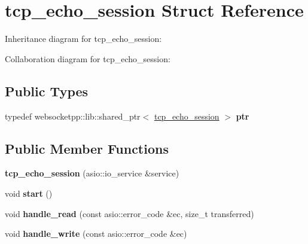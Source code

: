 \hypertarget{structtcp__echo__session}{}\section{tcp\+\_\+echo\+\_\+session Struct Reference}
\label{structtcp__echo__session}


Inheritance diagram for tcp\+\_\+echo\+\_\+session\+:


Collaboration diagram for tcp\+\_\+echo\+\_\+session\+:
\subsection*{Public Types}
\begin{DoxyCompactItemize}
\item 
\mbox{\label{structtcp__echo__session_a18cf3be69accd1d3488c41097866653f}} 
typedef websocketpp\+::lib\+::shared\+\_\+ptr$<$ \mbox{\hyperlink{structtcp__echo__session}{tcp\+\_\+echo\+\_\+session}} $>$ {\bfseries ptr}
\end{DoxyCompactItemize}
\subsection*{Public Member Functions}
\begin{DoxyCompactItemize}
\item 
\mbox{\label{structtcp__echo__session_aa4f976b3a616f492ff0ed3c8e274624a}} 
{\bfseries tcp\+\_\+echo\+\_\+session} (asio\+::io\+\_\+service \&service)
\item 
\mbox{\label{structtcp__echo__session_a003e24fe3bb0eba2f4357ee3d93d5e9e}} 
void {\bfseries start} ()
\item 
\mbox{\label{structtcp__echo__session_a8ea4e13c24ec64401992c92576b1c731}} 
void {\bfseries handle\+\_\+read} (const asio\+::error\+\_\+code \&ec, size\+\_\+t transferred)
\item 
\mbox{\label{structtcp__echo__session_a4e50f9b7b4554949093174c62cabc367}} 
void {\bfseries handle\+\_\+write} (const asio\+::error\+\_\+code \&ec)
\end{DoxyCompactItemize}

